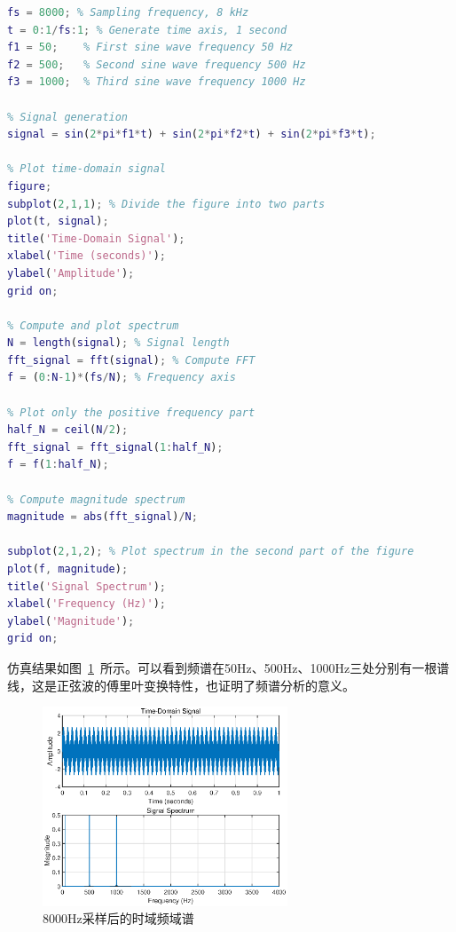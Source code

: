 \documentclass[lang=cn,newtx,10pt,scheme=chinese]{elegantbook}
\begin{document}
\begin{example}
  \begin{lstlisting}[language=matlab]
fs = 8000; % Sampling frequency, 8 kHz
t = 0:1/fs:1; % Generate time axis, 1 second
f1 = 50;    % First sine wave frequency 50 Hz
f2 = 500;   % Second sine wave frequency 500 Hz
f3 = 1000;  % Third sine wave frequency 1000 Hz

% Signal generation
signal = sin(2*pi*f1*t) + sin(2*pi*f2*t) + sin(2*pi*f3*t);

% Plot time-domain signal
figure;
subplot(2,1,1); % Divide the figure into two parts
plot(t, signal);
title('Time-Domain Signal');
xlabel('Time (seconds)');
ylabel('Amplitude');
grid on;

% Compute and plot spectrum
N = length(signal); % Signal length
fft_signal = fft(signal); % Compute FFT
f = (0:N-1)*(fs/N); % Frequency axis

% Plot only the positive frequency part
half_N = ceil(N/2);
fft_signal = fft_signal(1:half_N);
f = f(1:half_N);

% Compute magnitude spectrum
magnitude = abs(fft_signal)/N;

subplot(2,1,2); % Plot spectrum in the second part of the figure
plot(f, magnitude);
title('Signal Spectrum');
xlabel('Frequency (Hz)');
ylabel('Magnitude');
grid on;

  \end{lstlisting}
\end{example}
仿真结果如图~\ref{fig:fig1}~所示。可以看到频谱在50Hz、500Hz、1000Hz三处分别有一根谱线，这是正弦波的傅里叶变换特性，也证明了频谱分析的意义。
\begin{figure}[htbp]
  \centering
  \includegraphics[width=0.65\textwidth]{figure/exp1/fig1.eps}
  \caption{8000Hz采样后的时域频域谱}
  \label{fig:fig1}
\end{figure}
\end{document}
